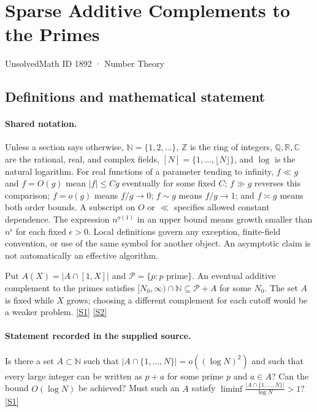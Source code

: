 \documentclass[11pt,a4paper]{article}
\newcommand{\N}{\mathbb{N}}
\newcommand{\Z}{\mathbb{Z}}
\newcommand{\Q}{\mathbb{Q}}
\newcommand{\R}{\mathbb{R}}
\newcommand{\C}{\mathbb{C}}
\newcommand{\sref}[2]{\hyperlink{source:#1:#2}{[S#2]}}
\begin{document}

\setcounter{section}{1891}

\section{Sparse Additive Complements to the Primes}\label{1892}

{\small\sffamily UnsolvedMath ID 1892 · Number Theory}

\subsection{Definitions and mathematical statement}

\paragraph{Shared notation.}Unless a section says otherwise, $\N=\{1,2,\ldots\}$,
$\Z$ is the ring of integers, $\Q,\R,\C$ are the rational, real, and complex
fields, $[N]=\{1,\ldots,\lfloor N\rfloor\}$, and $\log$ is the natural
logarithm. For real functions of a parameter tending to infinity,
$f\ll g$ and $f=O(g)$ mean $|f|\leq Cg$ eventually for some fixed $C$;
$f\gg g$ reverses this comparison; $f=o(g)$ means $f/g\to0$;
$f\sim g$ means $f/g\to1$; and $f\asymp g$ means both order bounds.
A subscript on $O$ or $\ll$ specifies allowed constant dependence.
The expression $n^{o(1)}$ in an upper bound means growth smaller than
$n^\epsilon$ for each fixed $\epsilon>0$. Local definitions govern any
exception, finite-field convention, or use of the same symbol for another
object. An asymptotic claim is not automatically an effective algorithm.



Put $A(X)=|A\cap[1,X]|$ and $\mathcal P=\{p:p\text{ prime}\}$. An eventual additive complement to the primes satisfies $[N_0,\infty)\cap\N\subseteq\mathcal P+A$ for some $N_0$. The set $A$ is fixed while $X$ grows; choosing a different complement for each cutoff would be a weaker problem. \sref{1892}{1} \sref{1892}{2}

\paragraph{Statement recorded in the supplied source.}
Is there a set $A\subset\mathbb{N}$ such that $ \lvert A\cap\{1,\ldots,N\}\rvert = o((\log N)^2) $ and such that every large integer can be written as $p+a$ for some prime $p$ and $a\in A$?
Can the bound $O(\log N)$ be achieved? Must such an $A$ satisfy $ \liminf \frac{\lvert A\cap\{1,\ldots,N\}\rvert}{\log N}> 1? $ \sref{1892}{1}
\end{document}
